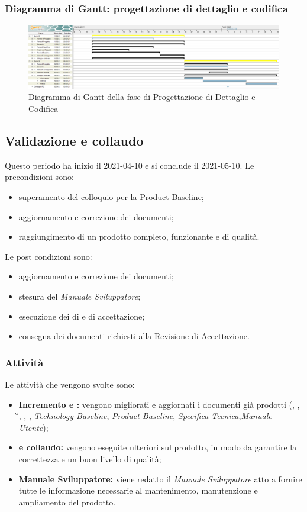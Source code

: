 \subsubsection{Diagramma di Gantt: progettazione di dettaglio e codifica}
\begin{figure}[H]
    \centering
    \includegraphics[scale = 0.25]{components/img/progettazione_dettaglio_codifica.png}
    \caption{Diagramma di Gantt della fase di Progettazione di Dettaglio e Codifica}
    \label{fig:Diagramma di Gantt, fase di Progettazione di dettaglio e codifica}
\end{figure}

\newpage
\subsection{Validazione e collaudo}
Questo periodo ha inizio il 2021-04-10 e si conclude il 2021-05-10.
Le precondizioni sono:
\begin{itemize}
	\item superamento del colloquio per la Product Baseline;
	\item aggiornamento e correzione dei documenti;
	\item raggiungimento di un prodotto completo, funzionante e di qualità.
\end{itemize}
Le post condizioni sono:
\begin{itemize}
	\item aggiornamento e correzione dei documenti;
	\item stesura del \textit{Manuale Sviluppatore};
	\item esecuzione dei  di  e di accettazione;
	\item consegna dei documenti richiesti alla Revisione di Accettazione.
\end{itemize}
\subsubsection{Attività}
Le attività che vengono svolte sono:
\begin{itemize}
	\item \textbf{Incremento e :} vengono migliorati e aggiornati i documenti già prodotti (\NdP{}, \PdP{}, \G{}, \PdQ{}, \AdR{}, \textit{Technology Baseline}, \textit{Product Baseline}, \textit{Specifica Tecnica},\textit{Manuale Utente});
	\item \textbf{ e collaudo:} vengono eseguite ulteriori  sul prodotto, in modo da garantire la correttezza e un buon livello di qualità;
	\item \textbf{Manuale Sviluppatore:} viene redatto il \textit{Manuale Sviluppatore} atto a fornire tutte le informazione necessarie al mantenimento, manutenzione e ampliamento del prodotto.
\end{itemize}

